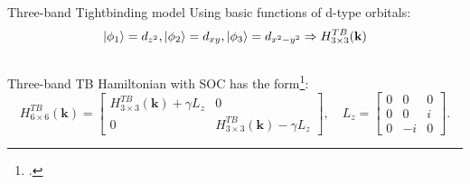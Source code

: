 \documentclass{beamer}
\begin{document}
\begin{frame}{Three-band Tightbinding model}
	Using basic functions of d-type orbitals: $$\ket{\phi_1} = d_{z^2}, \ket{\phi_2} = d_{xy}, \ket{\phi_3} = d_{x^2- y^2}\Rightarrow H^{TB}_{3\times 3}(\textbf{k})$$
	\\Three-band TB Hamiltonian with SOC has the form\footcite{liu_three-band_2013}:
	\begin{equation*}
		H^{TB}_{6\times 6}(\textbf{k}) = \begin{bmatrix}
			H^{TB}_{3\times 3}(\textbf{k}) + \gamma L_z & 0\\ 0& H^{TB}_{3\times 3}(\textbf{k}) - \gamma L_z
		\end{bmatrix}, \quad L_z= \begin{bmatrix}
			0 & 0 & 0\\
			0 & 0 & i\\
			0 & -i& 0
		\end{bmatrix}.
	\end{equation*}
\end{frame}
\end{document}
